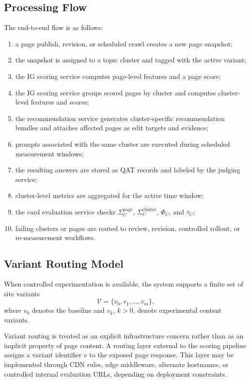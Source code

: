 \documentclass{article}
\begin{document}
\subsection{Processing Flow}

The end-to-end flow is as follows:
\begin{enumerate}
    \item a page publish, revision, or scheduled crawl creates a new page snapshot;
    \item the snapshot is assigned to a topic cluster and tagged with the active variant;
    \item the IG scoring service computes page-level features and a page score;
    \item the IG scoring service groups scored pages by cluster and computes cluster-level features and scores;
    \item the recommendation service generates cluster-specific recommendation bundles and attaches affected pages as edit targets and evidence;
    \item prompts associated with the same cluster are executed during scheduled measurement windows;
    \item the resulting answers are stored as QAT records and labeled by the judging service;
    \item cluster-level metrics are aggregated for the active time window;
    \item the card evaluation service checks \(\Sigma_C^{\text{page}}\), \(\Sigma_C^{\text{cluster}}\), \(\Phi_C\), and \(\tau_C\);
    \item failing clusters or pages are routed to review, revision, controlled rollout, or re-measurement workflows.
\end{enumerate}

\subsection{Variant Routing Model}

When controlled experimentation is available, the system supports a finite set of site variants
\[
\mathcal{V}=\{v_0,v_1,\dots,v_m\},
\]
where \(v_0\) denotes the baseline and \(v_k\), \(k>0\), denote experimental content variants.

Variant routing is treated as an explicit infrastructure concern rather than as an implicit property of page content. A routing layer external to the scoring pipeline assigns a variant identifier \(v\) to the exposed page response. This layer may be implemented through CDN rules, edge middleware, alternate hostnames, or controlled internal evaluation URLs, depending on deployment constraints.
\end{document}
